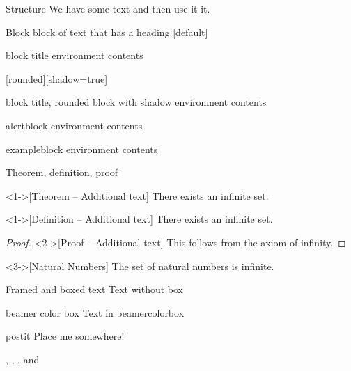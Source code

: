 \begin{frame}{Structure}
  We have some text and then use  it it.
\end{frame}

\begin{frame}{Block}
  block of text that has a heading
  [default]
  \begin{block}{block title}
  environment contents
  \end{block}
  [rounded][shadow=true]
  \begin{block}{block title, rounded block with shadow}
  environment contents
  \end{block}
  \begin{alertblock}{alertblock}
  environment contents
  \end{alertblock}
  \begin{exampleblock}{exampleblock}
  environment contents
  \end{exampleblock}
\end{frame}


\begin{frame}{Theorem, definition, proof}
  \begin{theorem}<1->[Theorem -- Additional text]
  There exists an infinite set.
  \end{theorem}
  \begin{definition}<1->[Definition -- Additional text]
  There exists an infinite set.
  \end{definition}
  \begin{proof}<2->[Proof -- Additional text]
  This follows from the axiom of infinity.
  \end{proof}
  \begin{example}<3->[Natural Numbers]
  The set of natural numbers is infinite.
  \end{example}
\end{frame}




\begin{frame}{Framed and boxed text}
  Text without box
  \begin{beamercolorbox}{beamer color box}
    Text in beamercolorbox
  \end{beamercolorbox}
  
  \begin{beamercolorbox}[sep=1em,wd=5cm]{postit}
    Place me somewhere!
  \end{beamercolorbox}
  
  , , , and 
\end{frame}


